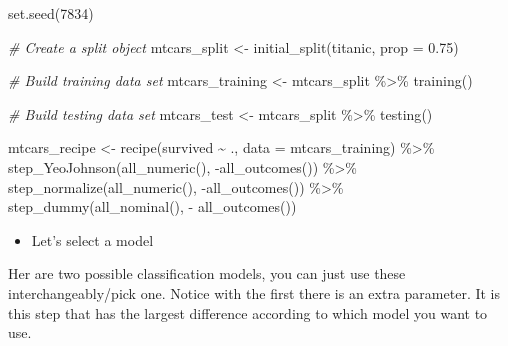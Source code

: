 \documentclass[
]{book}
\newenvironment{Shaded}{\begin{snugshade}}{\end{snugshade}}
\newcommand{\AttributeTok}[1]{\textcolor[rgb]{0.77,0.63,0.00}{#1}}
\newcommand{\CommentTok}[1]{\textcolor[rgb]{0.56,0.35,0.01}{\textit{#1}}}
\newcommand{\DecValTok}[1]{\textcolor[rgb]{0.00,0.00,0.81}{#1}}
\newcommand{\FloatTok}[1]{\textcolor[rgb]{0.00,0.00,0.81}{#1}}
\newcommand{\FunctionTok}[1]{\textcolor[rgb]{0.00,0.00,0.00}{#1}}
\newcommand{\NormalTok}[1]{#1}
\newcommand{\OtherTok}[1]{\textcolor[rgb]{0.56,0.35,0.01}{#1}}
\newcommand{\SpecialCharTok}[1]{\textcolor[rgb]{0.00,0.00,0.00}{#1}}
\providecommand{\tightlist}{%
  \setlength{\itemsep}{0pt}\setlength{\parskip}{0pt}}
\begin{document}
\begin{Shaded}
\begin{Highlighting}[]
\FunctionTok{set.seed}\NormalTok{(}\DecValTok{7834}\NormalTok{)}

\CommentTok{\# Create a split object}
\NormalTok{mtcars\_split }\OtherTok{\textless{}{-}} \FunctionTok{initial\_split}\NormalTok{(titanic, }\AttributeTok{prop =} \FloatTok{0.75}\NormalTok{)}

\CommentTok{\# Build training data set}
\NormalTok{mtcars\_training }\OtherTok{\textless{}{-}}\NormalTok{ mtcars\_split }\SpecialCharTok{\%\textgreater{}\%} 
                  \FunctionTok{training}\NormalTok{()}

\CommentTok{\# Build testing data set}
\NormalTok{mtcars\_test }\OtherTok{\textless{}{-}}\NormalTok{ mtcars\_split }\SpecialCharTok{\%\textgreater{}\%} 
              \FunctionTok{testing}\NormalTok{()}
\end{Highlighting}
\end{Shaded}

\begin{Shaded}
\begin{Highlighting}[]
\NormalTok{mtcars\_recipe }\OtherTok{\textless{}{-}} \FunctionTok{recipe}\NormalTok{(survived }\SpecialCharTok{\textasciitilde{}}\NormalTok{ ., }\AttributeTok{data =}\NormalTok{ mtcars\_training) }\SpecialCharTok{\%\textgreater{}\%} 
                \FunctionTok{step\_YeoJohnson}\NormalTok{(}\FunctionTok{all\_numeric}\NormalTok{(), }\SpecialCharTok{{-}}\FunctionTok{all\_outcomes}\NormalTok{()) }\SpecialCharTok{\%\textgreater{}\%} 
                \FunctionTok{step\_normalize}\NormalTok{(}\FunctionTok{all\_numeric}\NormalTok{(), }\SpecialCharTok{{-}}\FunctionTok{all\_outcomes}\NormalTok{()) }\SpecialCharTok{\%\textgreater{}\%} 
                \FunctionTok{step\_dummy}\NormalTok{(}\FunctionTok{all\_nominal}\NormalTok{(), }\SpecialCharTok{{-}} \FunctionTok{all\_outcomes}\NormalTok{())}
\end{Highlighting}
\end{Shaded}

\begin{itemize}
\tightlist
\item
  Let's select a model
\end{itemize}

Her are two possible classification models, you can just use these interchangeably/pick one. Notice with the first there is an extra parameter. It is this step that has the largest difference according to which model you want to use.
\end{document}
